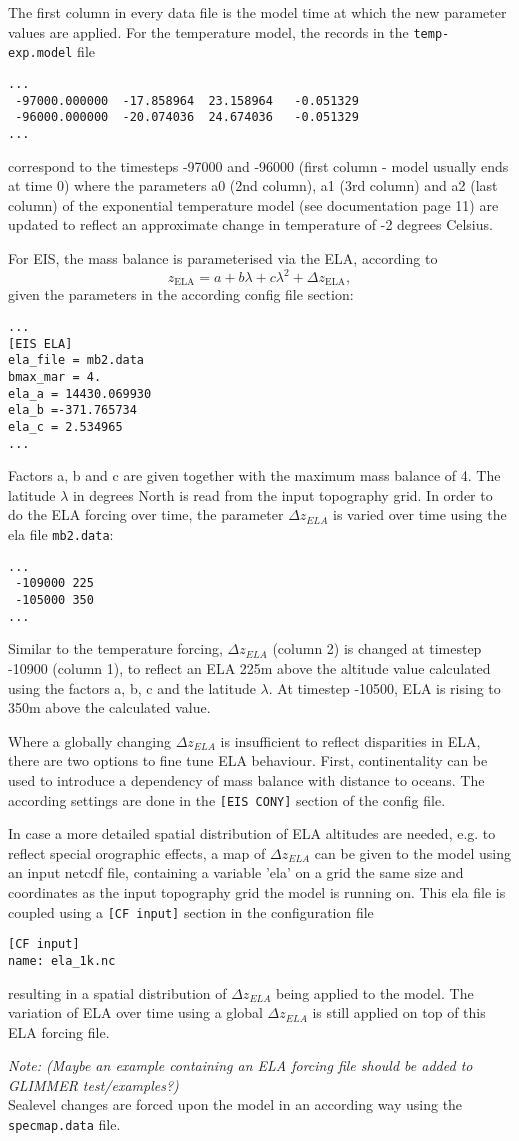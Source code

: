 The first column in every data file is the model time at which the new
parameter values are applied. For the temperature model, the records in the
\texttt{temp-exp.model} file
\begin{verbatim}
...
 -97000.000000  -17.858964  23.158964   -0.051329
 -96000.000000  -20.074036  24.674036   -0.051329
...
\end{verbatim}

correspond to the timesteps -97000 and -96000 (first column - model usually
ends at time 0) where the parameters a0 (2nd column), a1 (3rd column) and a2
(last column) of the exponential temperature model (see documentation page 11)
are updated to reflect an approximate change in temperature of -2 degrees
Celsius.

For EIS, the mass balance is parameterised via the ELA, according to
$$z_{\text{ELA}} = a + b\lambda + c\lambda^2 + \Delta z_{\text{ELA}},$$
given the parameters in the according config file section:
\begin{verbatim}
...
[EIS ELA]
ela_file = mb2.data
bmax_mar = 4.
ela_a = 14430.069930
ela_b =-371.765734
ela_c = 2.534965
...
\end{verbatim}
Factors a, b and c are given together with the maximum mass balance of 4. The
latitude $\lambda$ in degrees North is read from the input topography grid. In
order to do the ELA forcing over time, the parameter $\Delta z_{ELA}$ is varied
over time using the ela file \texttt{mb2.data}:
\begin{verbatim}
...
 -109000 225
 -105000 350
...
\end{verbatim}

Similar to the temperature forcing, $\Delta z_{ELA}$ (column 2) is changed at
timestep -10900 (column 1), to reflect an ELA 225m above the altitude value
calculated using the factors a, b, c and the latitude $\lambda$. At timestep
-10500, ELA is rising to 350m above the calculated value.

Where a globally changing $\Delta z_{ELA}$ is insufficient to reflect
disparities in ELA, there are two options to fine tune ELA behaviour. First,
continentality can be used to introduce a dependency of mass balance with
distance to oceans. The according settings are done in the \texttt{[EIS CONY]}
section of the config file.

In case a more detailed spatial distribution of ELA altitudes are needed, e.g.
to reflect special orographic effects, a map of $\Delta z_{ELA}$ can be given
to the model using an input netcdf file, containing a variable 'ela' on a grid
the same size and coordinates as the input topography grid the model is running
on. This ela file is coupled using a \texttt{[CF input]} section in the
configuration file
\begin{verbatim}
[CF input]
name: ela_1k.nc
\end{verbatim}
resulting in a spatial distribution of $\Delta z_{ELA}$ being applied to the
model. The variation of ELA over time using a global $\Delta z_{ELA}$ is still
applied on top of this ELA forcing file.

\textcolor[rgb]{1.00,0.00,0.00}{\emph{Note: (Maybe an example
containing an ELA forcing file should be added to GLIMMER test/examples?)}}
\\
Sealevel changes are forced upon the model in an according way using the
\texttt{specmap.data} file.
